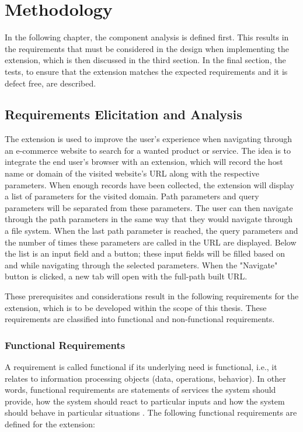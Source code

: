 \newpage
\chapter{Methodology}
In the following chapter, the component analysis is defined first. This results in the requirements that must be considered in the design when implementing the extension, which is then discussed in the third section. In the final section, the tests, to ensure that the extension matches the expected requirements and it is defect free, are described.

\section{Requirements Elicitation and Analysis}
The extension is used to improve the user's experience when navigating through an e-commerce website to search for a wanted product or service. The idea is to integrate the end user's browser with an extension, which will record the host name or domain of the visited website's URL along with the respective parameters. When enough records have been collected, the extension will display a list of parameters for the visited domain. Path parameters and query parameters will be separated from these parameters. The user can then navigate through the path parameters in the same way that they would navigate through a file system. When the last path parameter is reached, the query parameters and the number of times these parameters are called in the URL are displayed. Below the list is an input field and a button; these input fields will be filled based on and while navigating through the selected parameters. When the "Navigate" button is clicked, a new tab will open with the full-path built URL.

These prerequisites and considerations result in the following requirements for the extension, which is to be developed within the scope of this thesis. These requirements are classified into functional and non-functional requirements.

\subsection{Functional Requirements}
A requirement is called functional if its underlying need is functional, i.e., it relates to information processing objects (data, operations, behavior). In other words, functional requirements are statements of services the system should provide, how the system should react to particular inputs and how the system should behave in particular situations \autocite{sommerville2011software}. The following functional requirements are defined for the extension:

